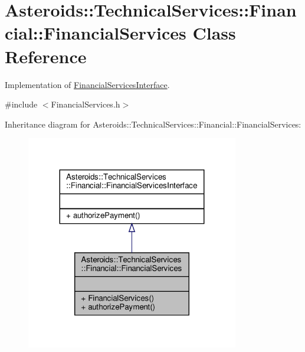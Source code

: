 \hypertarget{classAsteroids_1_1TechnicalServices_1_1Financial_1_1FinancialServices}{}\section{Asteroids\+:\+:Technical\+Services\+:\+:Financial\+:\+:Financial\+Services Class Reference}
\label{classAsteroids_1_1TechnicalServices_1_1Financial_1_1FinancialServices}


Implementation of \hyperlink{classAsteroids_1_1TechnicalServices_1_1Financial_1_1FinancialServicesInterface}{Financial\+Services\+Interface}.  




{\ttfamily \#include $<$Financial\+Services.\+h$>$}



Inheritance diagram for Asteroids\+:\+:Technical\+Services\+:\+:Financial\+:\+:Financial\+Services\+:\nopagebreak
\begin{figure}[H]
\begin{center}
\leavevmode
\includegraphics[width=263pt]{classAsteroids_1_1TechnicalServices_1_1Financial_1_1FinancialServices__inherit__graph}
\end{center}
\end{figure}



